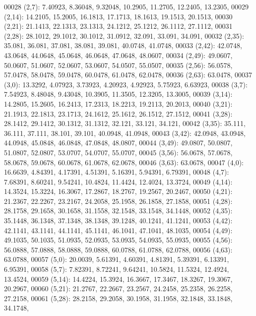 \begin{DoxyCode}
00028       (2,7): 7.40923, 8.36048, 9.32048, 10.2905, 11.2705, 12.2405, 13.2305,
00029       (2,14): 14.2105, 15.2005, 16.1813, 17.1713, 18.1613, 19.1513, 20.1513,
00030       (2,21): 21.1413, 22.1313, 23.1313, 24.1212, 25.1212, 26.1112, 27.1112,
00031       (2,28): 28.1012, 29.1012, 30.1012, 31.0912, 32.091, 33.091, 34.091,
00032       (2,35): 35.081, 36.081, 37.081, 38.081, 39.081, 40.0748, 41.0748,
00033       (2,42): 42.0748, 43.0648, 44.0648, 45.0648, 46.0648, 47.0648, 48.0607,
00034       (2,49): 49.0607, 50.0607, 51.0607, 52.0607, 53.0607, 54.0507, 55.0507,
00035       (2,56): 56.0578, 57.0478, 58.0478, 59.0478, 60.0478, 61.0478, 62.0478,
00036       (2,63): 63.0478,
00037       (3,0): 13.3292, 4.07923, 3.73923, 4.20923, 4.92923, 5.75923, 6.63923,
00038       (3,7): 7.54923, 8.48048, 9.43048, 10.3905, 11.3505, 12.3205, 13.3005,
00039       (3,14): 14.2805, 15.2605, 16.2413, 17.2313, 18.2213, 19.2113, 20.2013,
00040       (3,21): 21.1913, 22.1813, 23.1713, 24.1612, 25.1612, 26.1512, 27.1512,
00041       (3,28): 28.1412, 29.1412, 30.1312, 31.1312, 32.121, 33.121, 34.121,
00042       (3,35): 35.111, 36.111, 37.111, 38.101, 39.101, 40.0948, 41.0948,
00043       (3,42): 42.0948, 43.0948, 44.0948, 45.0848, 46.0848, 47.0848, 48.0807,
00044       (3,49): 49.0807, 50.0807, 51.0807, 52.0807, 53.0707, 54.0707, 55.0707,
00045       (3,56): 56.0678, 57.0678, 58.0678, 59.0678, 60.0678, 61.0678, 62.0678,
00046       (3,63): 63.0678,
00047       (4,0): 16.6639, 4.84391, 4.17391, 4.51391, 5.16391, 5.94391, 6.79391,
00048       (4,7): 7.68391, 8.60241, 9.54241, 10.4824, 11.4424, 12.4024, 13.3724,
00049       (4,14): 14.3524, 15.3224, 16.3067, 17.2867, 18.2767, 19.2567, 20.2467,
00050       (4,21): 21.2367, 22.2267, 23.2167, 24.2058, 25.1958, 26.1858, 27.1858,
00051       (4,28): 28.1758, 29.1658, 30.1658, 31.1558, 32.1548, 33.1548, 34.1448,
00052       (4,35): 35.1448, 36.1348, 37.1348, 38.1348, 39.1248, 40.1241, 41.1241,
00053       (4,42): 42.1141, 43.1141, 44.1141, 45.1141, 46.1041, 47.1041, 48.1035,
00054       (4,49): 49.1035, 50.1035, 51.0935, 52.0935, 53.0935, 54.0935, 55.0935,
00055       (4,56): 56.0888, 57.0888, 58.0888, 59.0888, 60.0788, 61.0788, 62.0788,
00056       (4,63): 63.0788,
00057       (5,0): 20.0039, 5.61391, 4.60391, 4.81391, 5.39391, 6.13391, 6.95391,
00058       (5,7): 7.82391, 8.72241, 9.64241, 10.5824, 11.5324, 12.4924, 13.4524,
00059       (5,14): 14.4224, 15.3924, 16.3667, 17.3467, 18.3267, 19.3067, 20.2967,
00060       (5,21): 21.2767, 22.2667, 23.2567, 24.2458, 25.2358, 26.2258, 27.2158,
00061       (5,28): 28.2158, 29.2058, 30.1958, 31.1958, 32.1848, 33.1848, 34.1748,

\end{DoxyCode}
